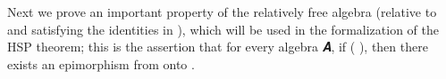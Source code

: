 \begin{code}
\AgdaSymbol{)}\<%
\\
%
\>[1]\AgdaSpace{}%
\AgdaSymbol{\{}\AgdaSpace{}%
\AgdaSymbol{=}\AgdaSpace{}%
\AgdaSymbol{\}}\AgdaSpace{}%
\AgdaSymbol{\{}\AgdaSpace{}%
\AgdaOperator{\AgdaInductiveConstructor{,}}\AgdaSpace{}%
\AgdaSymbol{\}}\AgdaSpace{}%
\AgdaSpace{}%
\AgdaSpace{}%
\AgdaSpace{}%
\AgdaSymbol{=}\AgdaSpace{}%
\AgdaSpace{}%
\AgdaSpace{}%
\AgdaSymbol{\{}\AgdaSpace{}%
\AgdaSymbol{=}\AgdaSpace{}%
\AgdaSymbol{\}\{}\AgdaSymbol{\}}\AgdaSpace{}%
\AgdaSymbol{(}\AgdaSpace{}%
\AgdaSymbol{)}\AgdaSpace{}%
\AgdaSpace{}%
\<%
\\
\>[1][@{}l@{\AgdaIndent{0}}]%
\>[2]\<%
\\
%
\>[2]\AgdaSpace{}%
\AgdaSymbol{:}\AgdaSpace{}%
\AgdaSpace{}%
\AgdaSymbol{\}}\AgdaSpace{}%
\AgdaSpace{}%
\AgdaSymbol{(}\AgdaSpace{}%
\AgdaSymbol{)}\AgdaSpace{}%
\AgdaSpace{}%
\AgdaSpace{}%
\AgdaSpace{}%
\AgdaSpace{}%
\AgdaSpace{}%
\AgdaSpace{}%
\AgdaSpace{}%
\AgdaSpace{}%
\AgdaSpace{}%
\AgdaSpace{}%
\AgdaSpace{}%
\<%
\\
%
\>[2]\AgdaSpace{}%
\AgdaSpace{}%
\AgdaSpace{}%
\AgdaSpace{}%
\AgdaSymbol{=}\AgdaSpace{}%
\AgdaSpace{}%
\AgdaSpace{}%
\AgdaSpace{}%
\AgdaSpace{}%
\AgdaSpace{}%
\AgdaSpace{}%
\AgdaSpace{}%
\AgdaSpace{}%
\AgdaSymbol{)}\AgdaSpace{}%
\AgdaSpace{}%
\AgdaSpace{}%
\AgdaSpace{}%
\AgdaSpace{}%
\AgdaSymbol{(}\AgdaSpace{}%
\AgdaSymbol{)}\AgdaSpace{}%
\<%
\\
\>[0]\<%
\end{code}
Next we prove an important property of the relatively free algebra (relative to  and satisfying the identities in  ), which will be used in the formalization of the HSP theorem; this is the assertion that for every algebra 𝑨, if    ( ), then there exists an epimorphism from  onto .

